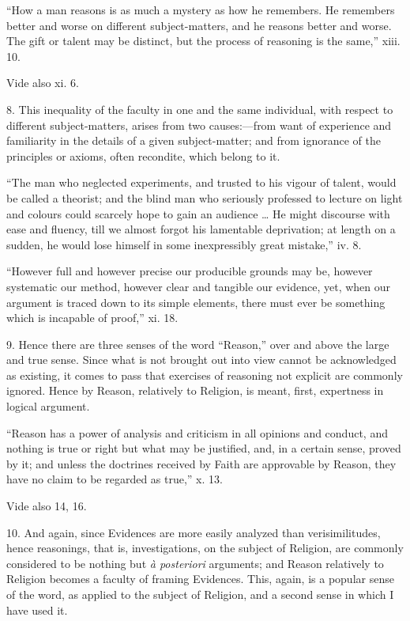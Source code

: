 ``How a man reasons is as much a mystery as how he remembers.
He remembers better and worse on different subject-matters, and he
reasons better and worse. The gift or talent may be distinct, but
the process of reasoning is the same,'' xiii. 10.


Vide also xi. 6.


8. This inequality of the faculty in one and the same individual,
with respect to different subject-matters, arises from two causes:—from
want of experience and familiarity in the details of a given
subject-matter; and from ignorance of the principles or axioms, often
recondite, which belong to it.


``The man who neglected experiments, and trusted to his
vigour of talent, would be called a theorist; and the blind man who
seriously professed to lecture on light and colours could scarcely
hope to gain an audience … He might discourse with ease and
fluency, till we almost forgot his lamentable deprivation; at length
on a sudden, he would lose himself in some inexpressibly great
mistake,'' iv. 8.


``However full and however precise our producible grounds
may be, however systematic our method, however clear and tangible
our evidence, yet, when our argument is traced down to its simple
elements, there must ever be something which is incapable of
proof,'' xi. 18.


9. Hence there are three senses of the word ``Reason,''
over and above the large and true sense. Since what is not brought out
into view cannot be acknowledged as existing, it comes to pass that
exercises of reasoning not explicit are commonly ignored. Hence by
Reason, relatively to Religion, is meant, first, expertness in logical
argument.


``Reason has a power of analysis and criticism in all
opinions and conduct, and nothing is true or right but what may be
justified, and, in a certain sense, proved by it; and unless the
doctrines received by Faith are approvable by Reason, they have no
claim to be regarded as true,'' x. 13.


Vide also 14, 16.


10. And again, since Evidences are more easily analyzed than
verisimilitudes, hence reasonings, that is, investigations, on the
subject of Religion, are commonly considered to be nothing but \emph{à
posteriori} arguments; and Reason relatively to Religion becomes a
faculty of framing Evidences. This, again, is a popular sense of the
word, as applied to the subject of Religion, and a second sense in
which I have used it.


